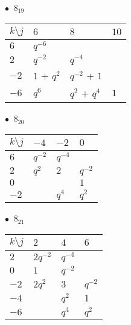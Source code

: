 %
\begin{minipage}{\linewidth}
$\bullet\ $ $8_{19}$ \vspace{0.5em} \\
\begin{tabular}{l|lll}
$k \setminus j$ & $6$ & $8$ & $10$ \\
\hline
$6$ & $q^{-6}$ &  &  \\
$2$ & $q^{-2}$ & $q^{-4}$ &  \\
$-2$ & $1$ + $q^{2}$ & $q^{-2}$ + $1$ &  \\
$-6$ & $q^{6}$ & $q^{2}$ + $q^{4}$ & $1$ \\
\end{tabular}
\vspace{2em}
\end{minipage}
%
\begin{minipage}{\linewidth}
$\bullet\ $ $8_{20}$ \vspace{0.5em} \\
\begin{tabular}{l|lll}
$k \setminus j$ & $-4$ & $-2$ & $0$ \\
\hline
$6$ & $q^{-2}$ & $q^{-4}$ &  \\
$2$ & $q^{2}$ & $2$ & $q^{-2}$ \\
$0$ &  &  & $1$ \\
$-2$ &  & $q^{4}$ & $q^{2}$ \\
\end{tabular}
\vspace{2em}
\end{minipage}
%
\begin{minipage}{\linewidth}
$\bullet\ $ $8_{21}$ \vspace{0.5em} \\
\begin{tabular}{l|lll}
$k \setminus j$ & $2$ & $4$ & $6$ \\
\hline
$2$ & $2q^{-2}$ & $q^{-4}$ &  \\
$0$ & $1$ & $q^{-2}$ &  \\
$-2$ & $2q^{2}$ & $3$ & $q^{-2}$ \\
$-4$ &  & $q^{2}$ & $1$ \\
$-6$ &  & $q^{4}$ & $q^{2}$ \\
\end{tabular}
\vspace{2em}
\end{minipage}
%